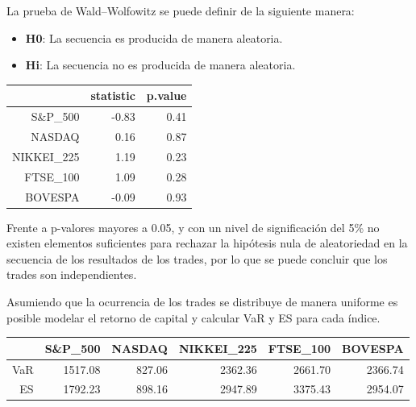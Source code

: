 \documentclass[a4paper,12pt]{Latex/Classes/PhDthesisPSnPDF}
\begin{document}
La prueba de Wald–Wolfowitz se puede definir de la siguiente manera:

\begin{itemize}
\item \textbf{H0}: La secuencia es producida de manera aleatoria.
\item \textbf{Hi}: La secuencia no es producida de manera aleatoria.
\end{itemize}

 
\begin{center}
\begin{table}[ht]
\centering
\begin{tabular}{rrr}
  \hline
 & statistic & p.value \\ 
  \hline
S\&P\_500 & -0.83 & 0.41 \\ 
  NASDAQ & 0.16 & 0.87 \\ 
  NIKKEI\_225 & 1.19 & 0.23 \\ 
  FTSE\_100 & 1.09 & 0.28 \\ 
  BOVESPA & -0.09 & 0.93 \\ 
   \hline
\end{tabular}
\end{table}\end{center}

Frente a p-valores mayores a 0.05, y con un nivel de significación del 5\% no existen elementos suficientes para rechazar la hipótesis nula de aleatoriedad en la secuencia de los resultados de los trades, por lo que se puede concluir que los trades son independientes.

Asumiendo que la ocurrencia de los trades se distribuye de manera uniforme es posible modelar el retorno de capital y calcular VaR y ES para cada índice.


\begin{center}
\begin{table}[ht]
\centering
\begin{tabular}{rrrrrr}
  \hline
 & S\&P\_500 & NASDAQ & NIKKEI\_225 & FTSE\_100 & BOVESPA \\ 
  \hline
VaR & 1517.08 & 827.06 & 2362.36 & 2661.70 & 2366.74 \\ 
  ES & 1792.23 & 898.16 & 2947.89 & 3375.43 & 2954.07 \\ 
   \hline
\end{tabular}
\end{table}\end{center}
  
\end{document}
